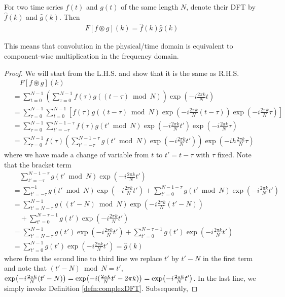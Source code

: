 \begin{thm}
\label{thm:circonv}
For two time series $f(t)$ and $g(t)$ of the same length $N$, denote their DFT by $\hat{f}(k)$ and $\hat{g}(k)$. Then
\begin{align}
F[f \circledast g](k) = \hat{f}(k)\hat{g}(k)
\end{align}
\end{thm}
This means that convolution in the physical/time domain is equivalent to component-wise multiplication in the frequency domain.
\begin{proof}
We will start from the L.H.S. and show that it is the same as R.H.S.
\begin{align*}
&\quad F[f \circledast g](k) \\
&= \sum_{t=0}^{N-1} \left(\sum_{\tau=0}^{N-1} f(\tau) g((t-\tau) \bmod N)\right) \exp(-i\frac{2\pi k}{N}t) \\
&= \sum_{\tau=0}^{N-1} \sum_{t=0}^{N-1} \left[f(\tau) g((t-\tau) \bmod N) \exp(-i\frac{2\pi k}{N}(t-\tau)) \exp(-i\frac{2\pi k}{N}\tau)\right] \\
&= \sum_{\tau=0}^{N-1} \sum_{t'=-\tau}^{N-1-\tau}  f(\tau) g(t' \bmod N) \exp(-i\frac{2\pi k}{N}t') \exp(-i\frac{2\pi k}{N}\tau) \\
&= \sum_{\tau=0}^{N-1} f(\tau) \left(\sum_{t'=-\tau}^{N-1-\tau} g(t' \bmod N) \exp(-i\frac{2\pi k}{N}t')\right) \exp(-ih\frac{2\pi k}{N}\tau)
\end{align*}
where we have made a change of variable from $t$ to $t' = t - \tau$ with $\tau$ fixed. Note that the bracket term
\begin{align*}
&\quad \sum_{t'=-\tau}^{N-1-\tau} g(t' \bmod N) \exp(-i\frac{2\pi k}{N}t') \\
&= \sum_{t'=-\tau}^{-1} g(t' \bmod N) \exp(-i\frac{2\pi k}{N}t') +  \sum_{t'=0}^{N-1-\tau} g(t' \bmod N) \exp(-i\frac{2\pi k}{N}t') \\
&= \sum_{t'=N-\tau}^{N-1} g((t'-N) \bmod N) \exp(-i\frac{2\pi k}{N}(t'-N)) \\
&\quad + \sum_{t'=0}^{N-\tau-1} g(t') \exp(-i\frac{2\pi k}{N}t') \\
&= \sum_{t'=N-\tau}^{N-1} g(t') \exp(-i\frac{2\pi k}{N}t') + \sum_{t'=0}^{N-\tau-1} g(t') \exp(-i\frac{2\pi k}{N}t') \\
&= \sum_{t'=0}^{N-1} g(t') \exp(-i\frac{2\pi k}{N}t') = \hat{g}(k)
\end{align*}
where from the second line to third line we replace $t'$ by $t' - N$ in the first term and note that $(t' - N) \bmod N = t'$, $\smash{\exp(-i\frac{2\pi k}{N}(t'-N))} = \smash{\exp(-i(\frac{2\pi k}{N}t' - 2\pi k))} = \smash{\exp(-i\frac{2\pi k}{N}t')}$. In the last line, we simply invoke Definition \ref{defn:complexDFT}. Subsequently,

\end{proof}
